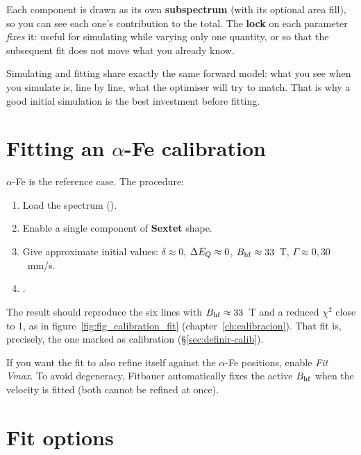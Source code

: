 Each component is drawn as its own \textbf{subspectrum} (with its optional area
fill), so you can see each one's contribution to the total. The
\textbf{lock} on each parameter \emph{fixes} it: useful for simulating while
varying only one quantity, or so that the subsequent fit does not move what you
already know.

\begin{nota}
Simulating and fitting share exactly the same forward model: what you see when you
simulate is, line by line, what the optimiser will try to match. That is why a
good initial simulation is the best investment before fitting.
\end{nota}


\section{Fitting an $\alpha$-Fe calibration}
\label{sec:ajustar-alphafe}

$\alpha$-Fe is the reference case. The procedure:

\begin{enumerate}[nosep]
  \item Load the spectrum ().
  \item Enable a single component of \textbf{Sextet} shape.
  \item Give approximate initial values: $\delta \approx 0$, $\Delta E_{Q} \approx 0$,
        $B_{\mathrm{hf}} \approx 33$~T, $\Gamma \approx 0{,}30$~mm/s.
  \item {}.
\end{enumerate}

The result should reproduce the six lines with $B_{\mathrm{hf}} \approx 33$~T and a
reduced $\chi^2$ close to 1, as in figure~\ref{fig:fig_calibration_fit}
(chapter~\ref{ch:calibracion}). That fit is, precisely, the one marked
as calibration (§\ref{sec:definir-calib}).

\begin{truco}
If you want the fit to also refine  itself against the
$\alpha$-Fe positions, enable \emph{Fit Vmax}. To avoid
degeneracy, Fitbauer automatically fixes the active $B_{\mathrm{hf}}$ when the
velocity is fitted (both cannot be refined at once).
\end{truco}

\section{Fit options}
\label{sec:opciones-ajuste}

